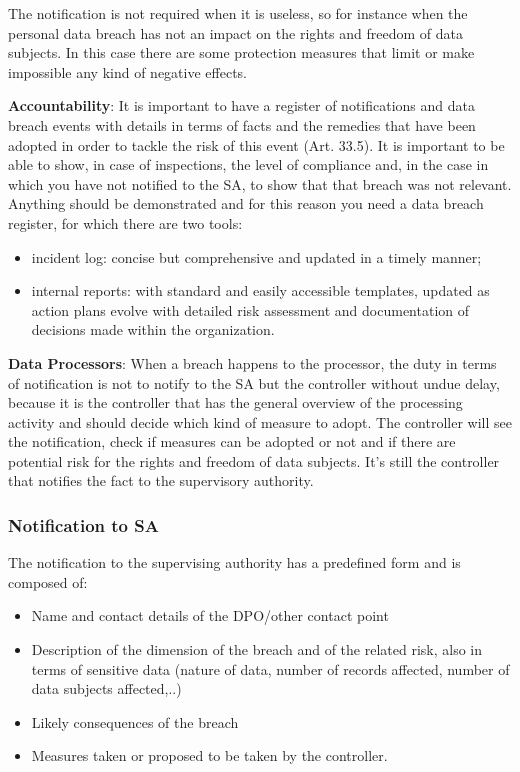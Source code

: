 The notification is not required when it is useless, so for instance when the personal data breach has not an impact on the rights and freedom of data subjects. In this case there are some protection measures that limit or make impossible any kind of negative effects.

\textbf{Accountability}: It is important to have a register of notifications and data breach events with details in terms of facts and the remedies that have been adopted in order to tackle the risk of this event (Art. 33.5). It is important to be able to show, in case of inspections, the level of compliance and, in the case in which you have not notified to the SA, to show that that breach was not relevant. Anything should be demonstrated and for this reason you need a data breach register, for which there are two tools:
\begin{itemize}
    \item incident log: concise but comprehensive and updated in a timely manner;
    \item internal reports: with standard and easily accessible templates, updated as action plans evolve with detailed risk assessment and documentation of decisions made within the organization.
\end{itemize}

\textbf{Data Processors}: When a breach happens to the processor, the duty in terms of notification is not to notify to the SA but the controller without undue delay, because it is the controller that has the general overview of the processing activity and should decide which kind of measure to adopt. The controller will see the notification, check if measures can be adopted or not and if there are potential risk for the rights and freedom of data subjects. It's still the controller that notifies the fact to the supervisory authority.

\subsubsection{Notification to SA}
The notification to the supervising authority has a predefined form and is composed of:
\begin{itemize}
    \item Name and contact details of the DPO/other contact point
    \item Description of the dimension of the breach and of the related risk, also in terms of sensitive data (nature of data, number of records affected, number of data subjects affected,..)
    \item Likely consequences of the breach
    \item Measures taken or proposed to be taken by the controller.
\end{itemize}



